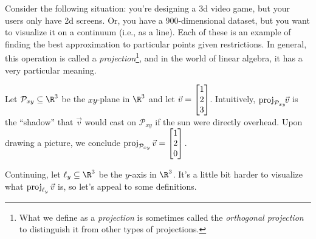 Consider the following situation: you're designing a 3d video game, but your users only have 2d screens.
Or, you have a 900-dimensional dataset, but you want to visualize it on a continuum (i.e., as a line). 
Each of these is an example
of finding the best approximation to particular points given restrictions. In general, this operation
is called a \emph{projection}\footnote{ What we define as a \emph{projection} is sometimes
called the \emph{orthogonal projection} to distinguish it from other types of projections.}, 
and in the world of linear algebra, it has a very particular meaning.


Let $\mathcal P_{xy}\subseteq\R^3$ be the $xy$-plane in $\R^3$ and let $\vec v=\mat{1\\2\\3}$. Intuitively, 
$\operatorname{proj}_{\mathcal P_{xy}}\!\!\vec v$ is the ``shadow'' that  $\vec v$ would cast on ${\mathcal P_{xy}}$ if 
the sun were directly overhead.
Upon drawing a picture, we conclude $
	\Proj_{\mathcal P_{xy}}\vec v=\mat{1\\2\\0}.
$

\begin{center}
\end{center}

Continuing, let $\ell_y\subseteq \R^3$ be the $y$-axis in $\R^3$. It's a little bit harder to visualize what $\operatorname{proj}_{\ell_y}\vec v$
is, so let's appeal to some definitions.

